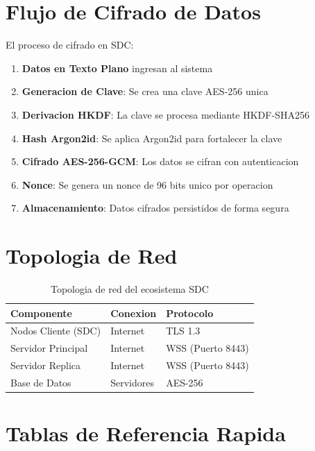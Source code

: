 \section{Flujo de Cifrado de Datos}
\label{sec:flujo-cifrado}

El proceso de cifrado en SDC:

\begin{enumerate}
    \item \textbf{Datos en Texto Plano} ingresan al sistema
    \item \textbf{Generacion de Clave}: Se crea una clave AES-256 unica
    \item \textbf{Derivacion HKDF}: La clave se procesa mediante HKDF-SHA256
    \item \textbf{Hash Argon2id}: Se aplica Argon2id para fortalecer la clave
    \item \textbf{Cifrado AES-256-GCM}: Los datos se cifran con autenticacion
    \item \textbf{Nonce}: Se genera un nonce de 96 bits unico por operacion
    \item \textbf{Almacenamiento}: Datos cifrados persistidos de forma segura
\end{enumerate}

\section{Topologia de Red}
\label{sec:topologia-red}

\begin{table}[H]
\centering
\begin{tabular}{p{4cm}p{4cm}p{5cm}}
\toprule
\textbf{Componente} & \textbf{Conexion} & \textbf{Protocolo} \\
\midrule
Nodos Cliente (SDC) & Internet & TLS 1.3 \\
\midrule
Servidor Principal & Internet & WSS (Puerto 8443) \\
\midrule
Servidor Replica & Internet & WSS (Puerto 8443) \\
\midrule
Base de Datos & Servidores & AES-256 \\
\bottomrule
\end{tabular}
\caption{Topologia de red del ecosistema SDC}
\label{tab:topologia-red}
\end{table}

\section{Tablas de Referencia Rapida}
\label{sec:tablas-ref}

